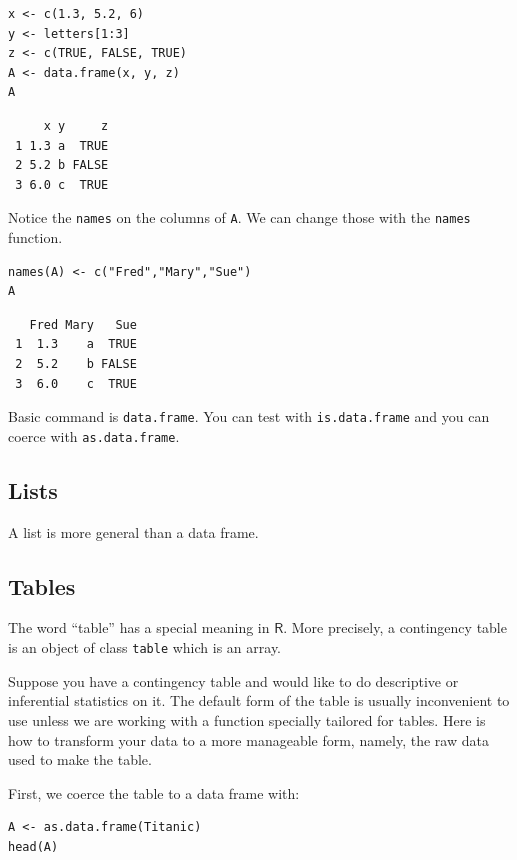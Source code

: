 \documentclass[captions=tableheading]{scrbook}
\begin{document}
\begin{example}
\lstset{language=R}
\begin{lstlisting}
x <- c(1.3, 5.2, 6)
y <- letters[1:3]
z <- c(TRUE, FALSE, TRUE)
A <- data.frame(x, y, z)
A
\end{lstlisting}

\begin{verbatim}
     x y     z
 1 1.3 a  TRUE
 2 5.2 b FALSE
 3 6.0 c  TRUE
\end{verbatim}

Notice the \texttt{names} on the columns of \texttt{A}. We can change those with the \texttt{names} function.


\lstset{language=R}
\begin{lstlisting}
names(A) <- c("Fred","Mary","Sue")
A
\end{lstlisting}

\begin{verbatim}
   Fred Mary   Sue
 1  1.3    a  TRUE
 2  5.2    b FALSE
 3  6.0    c  TRUE
\end{verbatim}

Basic command is \texttt{data.frame}. You can test with \texttt{is.data.frame} and you can coerce with \texttt{as.data.frame}.
\subsection{Lists}
\label{sec-20-1-4}

A list is more general than a data frame.
\subsection{Tables}
\label{sec-20-1-5}

The word ``table'' has a special meaning in \(\mathsf{R}\). More precisely, a contingency table is an object of class \texttt{table} which is an array.

Suppose you have a contingency table and would like to do descriptive or inferential statistics on it. The default form of the table is usually inconvenient to use unless we are working with a function specially tailored for tables. Here is how to transform your data to a more manageable form, namely, the raw data used to make the table.

First, we coerce the table to a data frame with: 


\lstset{language=R}
\begin{lstlisting}
A <- as.data.frame(Titanic)
head(A)
\end{lstlisting}


\end{example}
\end{document}
